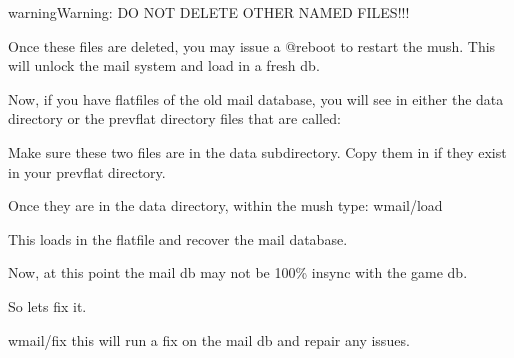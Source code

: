 \documentclass[letterpaper,10pt,english]{sphinxmanual}
\begin{document}
\begin{sphinxVerbatim}[commandchars=\\\{\}]
                 
               
\end{sphinxVerbatim}

\begin{sphinxadmonition}{warning}{Warning:}
\sphinxAtStartPar
DO NOT DELETE OTHER NAMED FILES!!!
\end{sphinxadmonition}

\sphinxAtStartPar
Once these files are deleted, you may issue a @reboot to restart the mush.
This will unlock the mail system and load in a fresh db.

\sphinxAtStartPar
Now, if you have flatfiles of the old mail database, you will see in either
the \textquotesingle{}data\textquotesingle{} directory or the \textquotesingle{}prevflat\textquotesingle{} directory files that are called:

\begin{sphinxVerbatim}[commandchars=\\\{\}]
\end{sphinxVerbatim}

\sphinxAtStartPar
Make sure these two files are in the \textquotesingle{}data\textquotesingle{} subdirectory.  Copy them in
if they exist in your \textquotesingle{}prevflat\textquotesingle{} directory.

\sphinxAtStartPar
Once they are in the \textquotesingle{}data\textquotesingle{} directory, within the mush type: wmail/load

\sphinxAtStartPar
This loads in the flatfile and recover the mail database.

\sphinxAtStartPar
Now, at this point the mail db may not be 100\% in\sphinxhyphen{}sync with the game db.

\sphinxAtStartPar
So let\textquotesingle{}s fix it.

\sphinxAtStartPar
wmail/fix   \sphinxhyphen{}\sphinxhyphen{} this will run a fix on the mail db and repair any issues.
\end{document}
